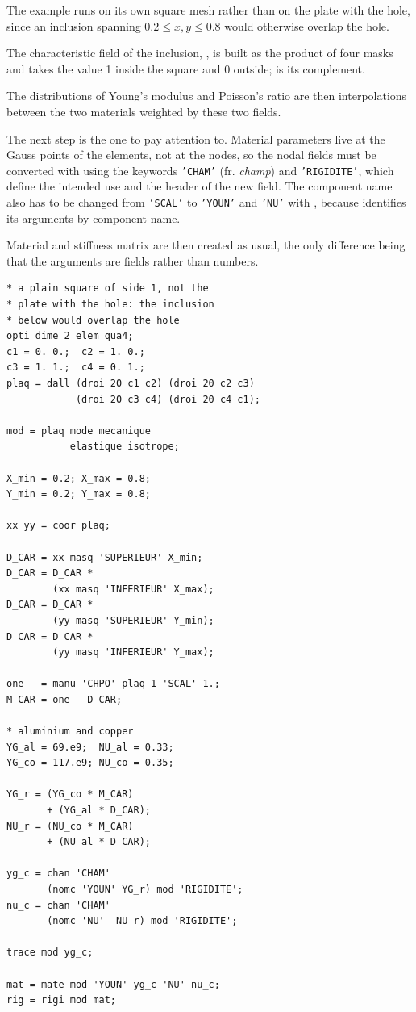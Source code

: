 \begin{castemcom}
The example runs on its own square mesh  rather than on the plate
with the hole, since an inclusion spanning $0.2\le x,y\le 0.8$ would otherwise
overlap the hole.

The characteristic field of the inclusion, , is built as the
product of four masks and takes the value 1 inside the square and 0 outside;
 is its complement.

The distributions of Young's modulus and Poisson's ratio are then
interpolations between the two materials weighted by these two fields.

The next step is the one to pay attention to. Material parameters live at the
Gauss points of the elements, not at the nodes, so the nodal fields must be
converted with 
 using the
keywords \texttt{'CHAM'} (fr. \emph{champ}) and \texttt{'RIGIDITE'}, which
define the intended use and the header of the new field.
%
 The component name
also has to be changed from \texttt{'SCAL'} to \texttt{'YOUN'} and
\texttt{'NU'} with  , because
 identifies its arguments by component name.

Material and stiffness matrix are then created as usual, the only difference
being that the arguments are fields rather than numbers.
\end{castemcom}
\begin{castemlines}
\begin{verbatim}
* a plain square of side 1, not the
* plate with the hole: the inclusion
* below would overlap the hole
opti dime 2 elem qua4;
c1 = 0. 0.;  c2 = 1. 0.;
c3 = 1. 1.;  c4 = 0. 1.;
plaq = dall (droi 20 c1 c2) (droi 20 c2 c3)
            (droi 20 c3 c4) (droi 20 c4 c1);

mod = plaq mode mecanique
           elastique isotrope;

X_min = 0.2; X_max = 0.8;
Y_min = 0.2; Y_max = 0.8;

xx yy = coor plaq;

D_CAR = xx masq 'SUPERIEUR' X_min;
D_CAR = D_CAR *
        (xx masq 'INFERIEUR' X_max);
D_CAR = D_CAR *
        (yy masq 'SUPERIEUR' Y_min);
D_CAR = D_CAR *
        (yy masq 'INFERIEUR' Y_max);

one   = manu 'CHPO' plaq 1 'SCAL' 1.;
M_CAR = one - D_CAR;

* aluminium and copper
YG_al = 69.e9;  NU_al = 0.33;
YG_co = 117.e9; NU_co = 0.35;

YG_r = (YG_co * M_CAR)
       + (YG_al * D_CAR);
NU_r = (NU_co * M_CAR)
       + (NU_al * D_CAR);

yg_c = chan 'CHAM'
       (nomc 'YOUN' YG_r) mod 'RIGIDITE';
nu_c = chan 'CHAM'
       (nomc 'NU'  NU_r) mod 'RIGIDITE';

trace mod yg_c;

mat = mate mod 'YOUN' yg_c 'NU' nu_c;
rig = rigi mod mat;
\end{verbatim}
\end{castemlines}

